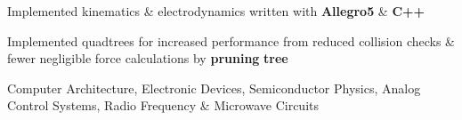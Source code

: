 \documentclass[]{chandan-cv}
\begin{document}
\begin{minipage}[t]{0.75\textwidth}
\descript{ }
\location{ }
\begin{tightemize}
	\item Implemented kinematics \& electrodynamics written with \textbf{Allegro5} \& \textbf{C++}
	\item Implemented quadtrees for increased performance from reduced collision checks \& fewer 
	negligible force calculations by \textbf{pruning} \textbf{tree}
\end{tightemize}
\sectionsep


\descript{ }
\location{ }
\begin{tightemize}
        \item Computer Architecture, Electronic Devices, Semiconductor Physics, Analog Control Systems, Radio Frequency \& Microwave Circuits
\end{tightemize}
\sectionsep



%
%

\end{minipage}
\end{document}

